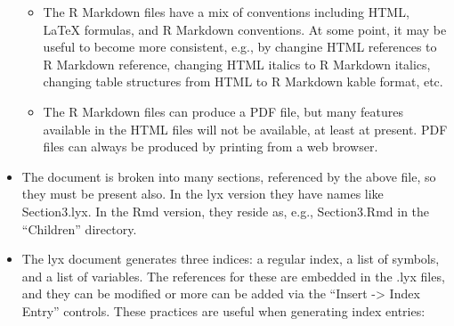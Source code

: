 \documentclass[
]{book}
\providecommand{\tightlist}{%
  \setlength{\itemsep}{0pt}\setlength{\parskip}{0pt}}
\begin{document}
\begin{itemize}
  \begin{itemize}
  \tightlist
  \item
    The R Markdown files have a mix of conventions including HTML, LaTeX formulas, and R Markdown
    conventions. At some point, it may be useful to become more consistent, e.g., by
    changine HTML references to R Markdown reference, changing HTML italics to R Markdown italics,
    changing table structures from HTML to R Markdown kable format, etc.\\
  \item
    The R Markdown files can produce a PDF file, but many features available in the HTML files will not be available, at least at present. PDF files can always be produced by printing from a web browser.\\
  \end{itemize}
\item
  The document is broken into many sections, referenced by the above file, so they must be present also. In the lyx version they have names like Section3.lyx. In the Rmd version, they reside as, e.g., Section3.Rmd in the ``Children'' directory.\\
\item
  The lyx document generates three indices: a regular index, a list of symbols, and a list of variables. The references for these are embedded in the .lyx files, and they can be modified or more can be added via the ``Insert -\textgreater{} Index Entry'' controls. These practices are useful when generating index entries:


\end{itemize}
\end{document}
